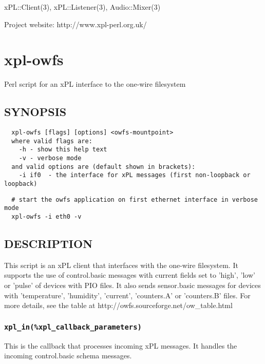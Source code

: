 \documentclass[12pt,a4paper]{article}
\begin{document}
xPL::Client(3), xPL::Listener(3), Audio::Mixer(3)



Project website: http://www.xpl-perl.org.uk/

\newpage
\section{xpl-owfs\label{xpl-owfs}}


Perl script for an xPL interface to the one-wire filesystem

\subsection*{SYNOPSIS\label{xpl-owfs_SYNOPSIS}}
\begin{verbatim}
  xpl-owfs [flags] [options] <owfs-mountpoint>
  where valid flags are:
    -h - show this help text
    -v - verbose mode
  and valid options are (default shown in brackets):
    -i if0  - the interface for xPL messages (first non-loopback or loopback)
\end{verbatim}
\begin{verbatim}
  # start the owfs application on first ethernet interface in verbose mode
  xpl-owfs -i eth0 -v
\end{verbatim}
\subsection*{DESCRIPTION\label{xpl-owfs_DESCRIPTION}}


This script is an xPL client that interfaces with the one-wire
filesystem.  It supports the use of control.basic messages with
current fields set to 'high', 'low' or 'pulse' of devices with PIO
files.  It also sends sensor.basic messages for devices with
'temperature', 'humidity', 'current', 'counters.A' or 'counters.B'
files.  For more details, see the table at http://owfs.sourceforge.net/ow\_table.html

\subsubsection*{\texttt{xpl\_in(\%xpl\_callback\_parameters)}\label{xpl-owfs_xpl_in_xpl_callback_parameters_}}


This is the callback that processes incoming xPL messages.  It handles
the incoming control.basic schema messages.
\end{document}
